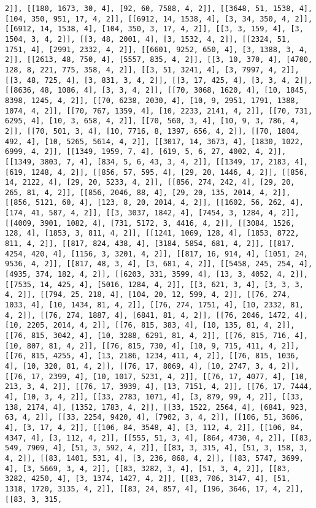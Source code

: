 \documentclass[12pt,fleqn]{article}\usepackage{../../common}
\begin{document}
\begin{verbatim}
2]], [[180, 1673, 30, 4], [92, 60, 7588, 4, 2]], [[3648, 51, 1538, 4], [104, 350, 951, 17, 4, 2]], [[6912, 14, 1538, 4], [3, 34, 350, 4, 2]], [[6912, 14, 1538, 4], [104, 350, 3, 17, 4, 2]], [[3, 3, 159, 4], [3, 1504, 3, 4, 2]], [[3, 48, 2001, 4], [3, 1532, 4, 2]], [[2324, 51, 1751, 4], [2991, 2332, 4, 2]], [[6601, 9252, 650, 4], [3, 1388, 3, 4, 2]], [[2613, 48, 750, 4], [5557, 835, 4, 2]], [[3, 10, 370, 4], [4700, 128, 8, 221, 775, 358, 4, 2]], [[3, 51, 3241, 4], [3, 7997, 4, 2]], [[3, 48, 725, 4], [3, 831, 3, 4, 2]], [[3, 17, 425, 4], [3, 3, 4, 2]], [[8636, 48, 1086, 4], [3, 3, 4, 2]], [[70, 3068, 1620, 4], [10, 1845, 8398, 1245, 4, 2]], [[70, 6238, 2030, 4], [10, 9, 2951, 1791, 1388, 1074, 4, 2]], [[70, 767, 1359, 4], [10, 2233, 2141, 4, 2]], [[70, 731, 6295, 4], [10, 3, 658, 4, 2]], [[70, 560, 3, 4], [10, 9, 3, 786, 4, 2]], [[70, 501, 3, 4], [10, 7716, 8, 1397, 656, 4, 2]], [[70, 1804, 492, 4], [10, 5265, 5614, 4, 2]], [[3017, 14, 3673, 4], [1830, 1022, 6999, 4, 2]], [[1349, 1959, 7, 4], [619, 5, 6, 27, 4002, 4, 2]], [[1349, 3803, 7, 4], [834, 5, 6, 43, 3, 4, 2]], [[1349, 17, 2183, 4], [619, 1248, 4, 2]], [[856, 57, 595, 4], [29, 20, 1446, 4, 2]], [[856, 14, 2122, 4], [29, 20, 5233, 4, 2]], [[856, 274, 242, 4], [29, 20, 265, 81, 4, 2]], [[856, 2046, 88, 4], [29, 20, 135, 2014, 4, 2]], [[856, 5121, 60, 4], [123, 8, 20, 2014, 4, 2]], [[1602, 56, 262, 4], [174, 41, 587, 4, 2]], [[3, 3037, 1842, 4], [7454, 3, 1284, 4, 2]], [[4009, 3901, 1082, 4], [731, 5172, 3, 4416, 4, 2]], [[3084, 1526, 128, 4], [1853, 3, 811, 4, 2]], [[1241, 1069, 128, 4], [1853, 8722, 811, 4, 2]], [[817, 824, 438, 4], [3184, 5854, 681, 4, 2]], [[817, 4254, 420, 4], [1156, 3, 3201, 4, 2]], [[817, 16, 914, 4], [1051, 24, 9536, 4, 2]], [[817, 48, 3, 4], [3, 681, 4, 2]], [[5458, 245, 254, 4], [4935, 374, 182, 4, 2]], [[6203, 331, 3599, 4], [13, 3, 4052, 4, 2]], [[7535, 14, 425, 4], [5016, 1284, 4, 2]], [[3, 621, 3, 4], [3, 3, 3, 4, 2]], [[794, 25, 218, 4], [104, 20, 12, 599, 4, 2]], [[76, 274, 1033, 4], [10, 1434, 81, 4, 2]], [[76, 274, 1751, 4], [10, 2332, 81, 4, 2]], [[76, 274, 1887, 4], [6841, 81, 4, 2]], [[76, 2046, 1472, 4], [10, 2205, 2014, 4, 2]], [[76, 815, 383, 4], [10, 135, 81, 4, 2]], [[76, 815, 3042, 4], [10, 3288, 6291, 81, 4, 2]], [[76, 815, 716, 4], [10, 807, 81, 4, 2]], [[76, 815, 730, 4], [10, 9, 715, 411, 4, 2]], [[76, 815, 4255, 4], [13, 2186, 1234, 411, 4, 2]], [[76, 815, 1036, 4], [10, 320, 81, 4, 2]], [[76, 17, 8069, 4], [10, 2747, 3, 4, 2]], [[76, 17, 2399, 4], [10, 1017, 5231, 4, 2]], [[76, 17, 4077, 4], [10, 213, 3, 4, 2]], [[76, 17, 3939, 4], [13, 7151, 4, 2]], [[76, 17, 7444, 4], [10, 3, 4, 2]], [[33, 2783, 1071, 4], [3, 879, 99, 4, 2]], [[33, 138, 2174, 4], [1352, 1783, 4, 2]], [[33, 1522, 2564, 4], [6841, 923, 63, 4, 2]], [[33, 2254, 9420, 4], [7902, 3, 4, 2]], [[106, 51, 3606, 4], [3, 17, 4, 2]], [[106, 84, 3548, 4], [3, 112, 4, 2]], [[106, 84, 4347, 4], [3, 112, 4, 2]], [[555, 51, 3, 4], [864, 4730, 4, 2]], [[83, 549, 7909, 4], [51, 3, 592, 4, 2]], [[83, 3, 315, 4], [51, 3, 158, 3, 4, 2]], [[83, 1401, 531, 4], [3, 236, 868, 4, 2]], [[83, 5747, 3699, 4], [3, 5669, 3, 4, 2]], [[83, 3282, 3, 4], [51, 3, 4, 2]], [[83, 3282, 4250, 4], [3, 1374, 1427, 4, 2]], [[83, 706, 3147, 4], [51, 1318, 1720, 3135, 4, 2]], [[83, 24, 857, 4], [196, 3646, 17, 4, 2]], [[83, 3, 315, 
\end{verbatim}
\end{document}
